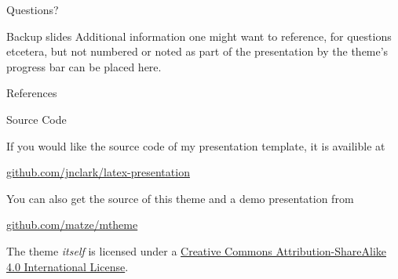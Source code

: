 \documentclass[10pt]{beamer}
\begin{document}
\begin{frame}[standout]
  Questions?
\end{frame}

\appendix

\begin{frame}[fragile]{Backup slides}
  Additional information one might want to reference, for questions etcetera, but not numbered or noted as part of the presentation by the theme's progress bar can be placed here.
\end{frame}

\begin{frame}[allowframebreaks]{References}

  
  

\end{frame}

\begin{frame}{Source Code}

  If you would like the source code of my presentation template, it is availible at 

  \begin{center}\url{github.com/jnclark/latex-presentation}\end{center}

  You can also get the source of this theme and a demo presentation from

  \begin{center}\url{github.com/matze/mtheme}\end{center}

  The theme \emph{itself} is licensed under a
  \href{http://creativecommons.org/licenses/by-sa/4.0/}{Creative Commons
  Attribution-ShareAlike 4.0 International License}.

  \begin{center}\ccbysa\end{center}
\end{frame}
\end{document}
